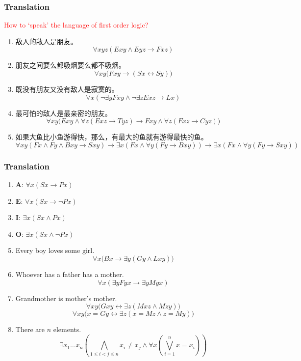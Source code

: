 \documentclass[UTF8,11pt,colorlinks,compress,openany]{beamer}%
\begin{document}
\begin{frame}\frametitle{Translation}
\begin{block}{}
	\centering\textcolor{red}{How to `speak' the language of first order logic?}
\end{block}
\begin{enumerate}
	\item 敌人的敌人是朋友。
	\[\forall xyz(Exy\wedge Eyz\to Fxz)\]
	\item 朋友之间要么都吸烟要么都不吸烟。
	\[\forall xy\big(Fxy\to (Sx\leftrightarrow Sy)\big)\]
	\item 既没有朋友又没有敌人是寂寞的。
	\[\forall x(\neg\exists yFxy\wedge\neg\exists zExz\to Lx)\]
	\item 最可怕的敌人是最亲密的朋友。
	\[\forall xy\big(Exy\wedge\forall z(Exz\to Tyz)\to Fxy\wedge\forall z(Fxz\to Cyz)\big)\]
	\item 如果大鱼比小鱼游得快，那么，有最大的鱼就有游得最快的鱼。\\
	$\forall xy(Fx\wedge Fy\wedge Bxy\to Sxy)\to\exists x(Fx\wedge\forall y(Fy\to Bxy))\to\exists x(Fx\wedge\forall y(Fy\to Sxy))$
\end{enumerate}
\end{frame}

\begin{frame}\frametitle{Translation}
		\begin{enumerate}
			\item $\mathbf{A}$: $\forall x(Sx\to Px)$
			\item $\mathbf{E}$: $\forall x(Sx\to \neg Px)$
			\item $\mathbf{I}$: $\exists x(Sx\wedge Px)$
			\item $\mathbf{O}$: $\exists x(Sx\wedge \neg Px)$
			\item Every boy loves some girl.
			\[\forall x\big(Bx\to\exists y(Gy\wedge Lxy)\big)\]
			\item Whoever has a father has a mother.
			\[\forall x(\exists y Fyx\to\exists y Myx)\]
			\item Grandmother is mother's mother.
			\[\forall xy\big(Gxy\leftrightarrow\exists z(Mxz\wedge Mzy)\big)\]
			\[\forall xy\big(x=Gy\leftrightarrow\exists z(x=Mz\wedge z=My)\big)\]
			\item There are $n$ elements.
			\[\exists x_1\dots x_n\left(\bigwedge\limits_{1\leq i<j\leq n}x_i\ne x_j\wedge\forall x\left(\bigvee\limits_{i=1}^n x=x_i\right)\right)\]
		\end{enumerate}
\end{frame}
\end{document}

